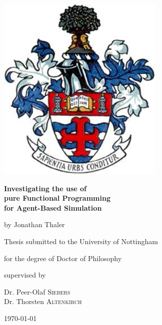 \documentclass[oneside]{book}
\begin{document}
\begin{titlepage}
	\centering
	\includegraphics[width=0.60\textwidth]{./logo/coat_of_arms.jpg}\par\vspace{1cm}
	\vspace{1.5cm}
	{\huge\bfseries Investigating the use of \\ pure Functional Programming \\ for Agent-Based Simulation \par}
	\vspace{2cm}
	{\Large by Jonathan Thaler \par}
	\vfill
	Thesis submitted to the University of Nottingham \par
	for the degree of Doctor of Philosophy \par
	
	\vfill
	
	\small
	supervised by\par
	Dr. Peer-Olaf \textsc{Siebers} \\
	Dr. Thorsten \textsc{Altenkirch}

	\vfill
	{\large \today\par}
\end{titlepage}
\end{document}
